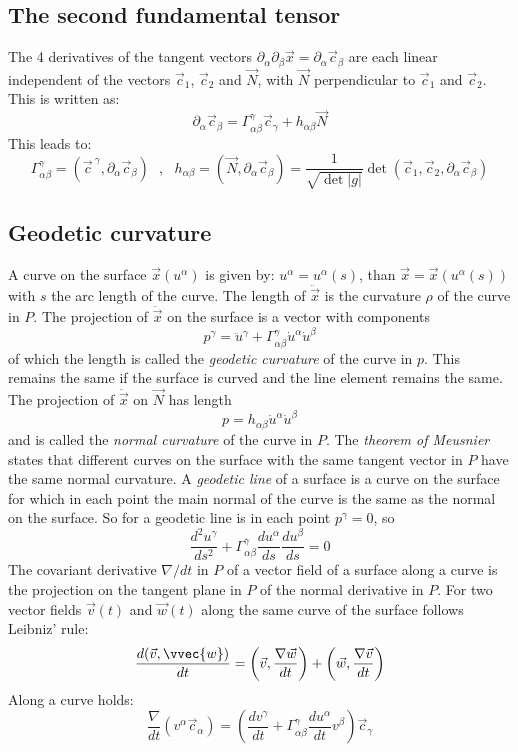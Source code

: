\subsection{The second fundamental tensor}
The 4 derivatives of the tangent vectors
$\partial_\alpha\partial_\beta\vec{x}=\partial_\alpha\vec{c}_\beta$ are each
linear independent of the vectors $\vec{c}_1$, $\vec{c}_2$ and $\vec{N}$, with
$\vec{N}$ perpendicular to $\vec{c}_1$ and $\vec{c}_2$. This is written as:
\[
\partial_\alpha\vec{c}_\beta=\Gamma^\gamma_{\alpha\beta}\vec{c}_\gamma+h_{\alpha\beta}\vec{N}
\]
This leads to:
\[
\Gamma^\gamma_{\alpha\beta}=(\vec{c}^{~\gamma},\partial_\alpha\vec{c}_\beta)~~~,~~~
h_{\alpha\beta}=(\vec{N},\partial_\alpha\vec{c}_\beta)=\frac{1}{\sqrt{\det|g|}}\det(\vec{c}_1,\vec{c}_2,\partial_\alpha\vec{c}_\beta)
\]

\subsection{Geodetic curvature}
A curve on the surface $\vec{x}(u^\alpha)$ is given by:
$u^\alpha=u^\alpha(s)$, than $\vec{x}=\vec{x}(u^\alpha(s))$ with $s$ the
arc length of the curve. The length of $\ddot{\vec{x}}$ is the curvature
$\rho$ of the curve in $P$. The projection of $\ddot{\vec{x}}$ on the surface
is a vector with components
\[
p^\gamma=\ddot{u}^\gamma+\Gamma^\gamma_{\alpha\beta}\dot{u}^\alpha\dot{u}^\beta
\]
of which the length is called the {\it geodetic curvature} of the curve in $p$.
This remains the same if the surface is curved and the line element remains the
same. The projection of $\ddot{\vec{x}}$ on $\vec{N}$ has length
\[
p=h_{\alpha\beta}\dot{u}^\alpha\dot{u}^\beta
\]
and is called the {\it normal curvature} of the curve in $P$. The {\it theorem
of Meusnier} states that different curves on the surface with the same tangent
vector in $P$ have the same normal curvature.
\npar
A {\it geodetic line} of a surface is a curve on the surface for which in each
point the main normal of the curve is the same as the normal on the surface.
So for a geodetic line is in each point $p^\gamma=0$, so
\[
\frac{d^2u^\gamma}{ds^2}+\Gamma^\gamma_{\alpha\beta}\frac{du^\alpha}{ds}\frac{du^\beta}{ds}=0
\]
The covariant derivative $\nabla/dt$ in $P$ of a vector field of a surface along
a curve is the projection on the tangent plane in $P$ of the normal derivative
in $P$.
\npar
For two vector fields $\vec{v}(t)$ and $\vec{w}(t)$ along the same curve of
the surface follows Leibniz' rule:
\[
\frac{d(\vec{v},\vvec{w})}{dt}=\left(\vec{v},\frac{\nabla\vec{w}}{dt}\right)+\left(\vec{w},\frac{\nabla\vec{v}}{dt}\right)
\]
Along a curve holds:
\[
\frac{\nabla}{dt}(v^\alpha\vec{c}_\alpha)=\left(\frac{dv^\gamma}{dt}+\Gamma^\gamma_{\alpha\beta}\frac{du^\alpha}{dt}v^\beta\right)\vec{c}_\gamma
\]

